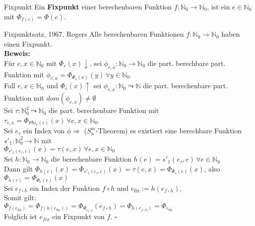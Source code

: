 \begin{defn}{Fixpunkt}
    Ein \textbf{Fixpunkt} einer berechenbaren Funktion $f: \mathbb{N}_0 \rightarrow \mathbb{N}_0$, ist ein 
    $e \in \mathbb{N}_0$ mit $\Phi_{f(e)} = \Phi(e)$.
\end{defn}

\begin{satz}{Fixpunktsatz, 1967, Rogers}
    Alle berechenbaren Funktionen $f: \mathbb{N}_0 \rightarrow \mathbb{N}_0$ haben einen Fixpunkt. \\

    \textbf{Beweis:} \\
    Für $e,x \in \mathbb{N}_0$ mit $\Phi_e(x)\downarrow$, sei $\phi_{e,x} : \mathbb{N}_0 \rightarrow \mathbb{N}_0$ die 
    part. berechbare part. Funktion mit $\phi_{e,x} = \Phi_{\Phi_e(x)}(y) \, \forall y \in \mathbb{N}_0$. \\
    Fall $e,x \in \mathbb{N}_0$ und $\Phi_e(x)\uparrow$ sei $\phi_{e,x}: \mathbb{N}_0 \leadsto \mathbb{N}$ die part. berechenbare part.
    Funktion mit $dom(\phi_{e,x}) \neq \emptyset$ \\

    Sei $\tau : \mathbb{N}_0^2 \leadsto \mathbb{N}_0$ die part. berechenbare Funktion mit  $\tau_{e,x} = \Phi_{Phi_e(e)}(x) \,
    \forall e,x \in \mathbb{N}_0$. \\

    Sei $e_\tau$ ein Index von $\phi \Rightarrow$ ($S^m_n$-Theorem) es existiert eine berechbare Funktion
    $s'_1: \mathbb{N}_0^2 \rightarrow \mathbb{N}$ mit \\
    $\Phi_{s'_1(e_\tau,e)}(x) = \tau(e,x) \, \forall e,x \in \mathbb{N}_0$ \\

    Sei $h: \mathbb{N}_0 \rightarrow \mathbb{N}_0$ die berechenbare Funktion $h(e) = s'_1(e_\tau,e) \, \forall e \in \mathbb{N}_0$ \\
    Dann gilt $\Phi_{h(e)}(x) = \Phi_{s'_1(e_\tau,e)}(x) = \tau(e,x) = \Phi_{\Phi_e(e)}(x)$, also \\
    $\Phi_{h(e)} = \Phi_{\Phi_e(e)}(x)$ \\

    Sei $e_{f \circ h}$ ein Index der Funktion $f \circ h$ und $e_{\text{fix}}:=h(e_{f \circ h})$. \\
    Somit gilt: \\
    $\Phi_{f(e_{\text{fix}})} = \Phi_{f(h(e_{\text{fix}}))} = \Phi_{\Phi_{e_{f \circ h}}}(e_{f \circ h}) = \Phi_{h(e_{f \circ h})} = \Phi_{e_{\text{fix}}}$ \\

    Folglich ist $e_{fix}$ ein Fixpunkt von $f$. $\square$
\end{satz}

